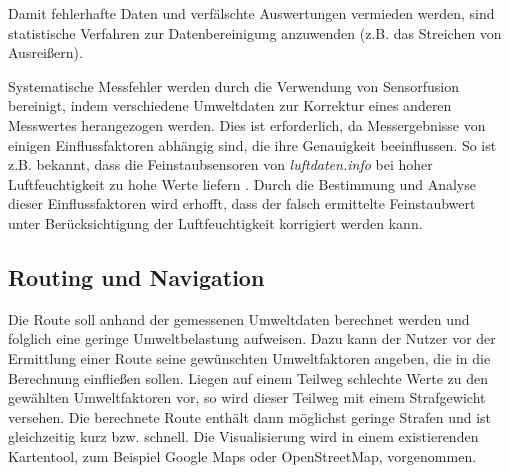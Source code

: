 Damit fehlerhafte Daten und verfälschte Auswertungen vermieden werden, sind statistische Verfahren zur Datenbereinigung anzuwenden (z.B. das Streichen von Ausreißern).

Systematische Messfehler werden durch die Verwendung von Sensorfusion bereinigt, indem verschiedene Umweltdaten zur Korrektur eines anderen Messwertes herangezogen werden. Dies ist erforderlich, da Messergebnisse von einigen Einflussfaktoren abhängig sind, die ihre Genauigkeit beeinflussen. So ist z.B. bekannt, dass die Feinstaubsensoren von \textit{luftdaten.info} bei hoher Luftfeuchtigkeit zu hohe Werte liefern \cite{luftdateninfoMessgenauigkeit}. Durch die Bestimmung und Analyse dieser Einflussfaktoren wird erhofft, dass der falsch ermittelte Feinstaubwert unter Berücksichtigung der Luftfeuchtigkeit korrigiert werden kann.

\subsection{Routing und Navigation}
\label{sec:Routing_und_Navigation_Loesung}
Die Route soll anhand der gemessenen Umweltdaten berechnet werden und folglich eine geringe Umweltbelastung aufweisen. Dazu kann der Nutzer vor der Ermittlung einer Route seine gewünschten Umweltfaktoren angeben, die in die Berechnung einfließen sollen. Liegen auf einem Teilweg schlechte Werte zu den gewählten Umweltfaktoren vor, so wird dieser Teilweg mit einem Strafgewicht versehen. Die berechnete Route enthält dann möglichst geringe Strafen und ist gleichzeitig kurz bzw. schnell. Die Visualisierung wird in einem existierenden Kartentool, zum Beispiel Google Maps oder OpenStreetMap, vorgenommen.

